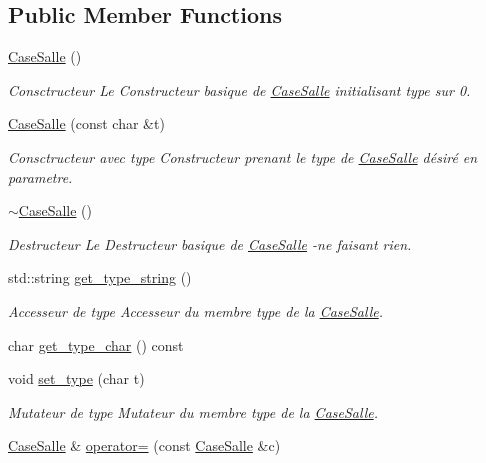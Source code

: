 \subsection*{Public Member Functions}
\begin{DoxyCompactItemize}
\item 
\hyperlink{classCaseSalle_a4252822534722fccb7d8355f79d7f244}{Case\+Salle} ()
\begin{DoxyCompactList}\small\item\em Consctructeur Le Constructeur basique de \hyperlink{classCaseSalle}{Case\+Salle} initialisant type sur 0. \end{DoxyCompactList}\item 
\hyperlink{classCaseSalle_a41a8f19ea923b523eb7695d87cd36342}{Case\+Salle} (const char \&t)
\begin{DoxyCompactList}\small\item\em Consctructeur avec type Constructeur prenant le type de \hyperlink{classCaseSalle}{Case\+Salle} désiré en parametre. \end{DoxyCompactList}\item 
\hyperlink{classCaseSalle_aca43a910dbbb59bdac7af10faa5b3f39}{$\sim$\+Case\+Salle} ()
\begin{DoxyCompactList}\small\item\em Destructeur Le Destructeur basique de \hyperlink{classCaseSalle}{Case\+Salle} -\/ne faisant rien. \end{DoxyCompactList}\item 
std\+::string \hyperlink{classCaseSalle_a13007bde12e9dcf3e1985473700c8fae}{get\+\_\+type\+\_\+string} ()
\begin{DoxyCompactList}\small\item\em Accesseur de {\itshape type} Accesseur du membre {\itshape type} de la \hyperlink{classCaseSalle}{Case\+Salle}. \end{DoxyCompactList}\item 
char \hyperlink{classCaseSalle_aa7bbf9560e21e56a0246a90b052b036f}{get\+\_\+type\+\_\+char} () const 
\item 
void \hyperlink{classCaseSalle_a6dfe626ca8e900f21b03113fb7c5e5f8}{set\+\_\+type} (char t)
\begin{DoxyCompactList}\small\item\em Mutateur de {\itshape type} Mutateur du membre {\itshape type} de la \hyperlink{classCaseSalle}{Case\+Salle}. \end{DoxyCompactList}\item 
\hyperlink{classCaseSalle}{Case\+Salle} \& \hyperlink{classCaseSalle_a8494bda87f21c608d7da7bb510c0e525}{operator=} (const \hyperlink{classCaseSalle}{Case\+Salle} \&c)

\end{DoxyCompactItemize}
